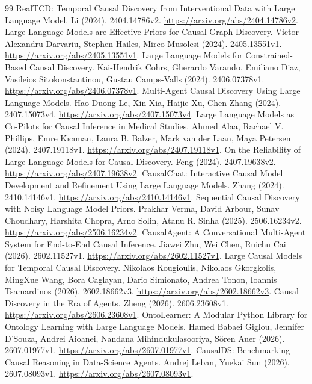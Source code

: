 \begin{thebibliography}{99}
 RealTCD: Temporal Causal Discovery from Interventional Data with Large Language Model. Li (2024). 2404.14786v2. \url{https://arxiv.org/abs/2404.14786v2}.
 Large Language Models are Effective Priors for Causal Graph Discovery. Victor-Alexandru Darvariu, Stephen Hailes, Mirco Musolesi (2024). 2405.13551v1. \url{https://arxiv.org/abs/2405.13551v1}.
 Large Language Models for Constrained-Based Causal Discovery. Kai-Hendrik Cohrs, Gherardo Varando, Emiliano Diaz, Vasileios Sitokonstantinou, Gustau Camps-Valls (2024). 2406.07378v1. \url{https://arxiv.org/abs/2406.07378v1}.
 Multi-Agent Causal Discovery Using Large Language Models. Hao Duong Le, Xin Xia, Haijie Xu, Chen Zhang (2024). 2407.15073v4. \url{https://arxiv.org/abs/2407.15073v4}.
 Large Language Models as Co-Pilots for Causal Inference in Medical Studies. Ahmed Alaa, Rachael V. Phillips, Emre Kıcıman, Laura B. Balzer, Mark van der Laan, Maya Petersen (2024). 2407.19118v1. \url{https://arxiv.org/abs/2407.19118v1}.
 On the Reliability of Large Language Models for Causal Discovery. Feng (2024). 2407.19638v2. \url{https://arxiv.org/abs/2407.19638v2}.
 CausalChat: Interactive Causal Model Development and Refinement Using Large Language Models. Zhang (2024). 2410.14146v1. \url{https://arxiv.org/abs/2410.14146v1}.
 Sequential Causal Discovery with Noisy Language Model Priors. Prakhar Verma, David Arbour, Sunav Choudhary, Harshita Chopra, Arno Solin, Atanu R. Sinha (2025). 2506.16234v2. \url{https://arxiv.org/abs/2506.16234v2}.
 CausalAgent: A Conversational Multi-Agent System for End-to-End Causal Inference. Jiawei Zhu, Wei Chen, Ruichu Cai (2026). 2602.11527v1. \url{https://arxiv.org/abs/2602.11527v1}.
 Large Causal Models for Temporal Causal Discovery. Nikolaos Kougioulis, Nikolaos Gkorgkolis, MingXue Wang, Bora Caglayan, Dario Simionato, Andrea Tonon, Ioannis Tsamardinos (2026). 2602.18662v3. \url{https://arxiv.org/abs/2602.18662v3}.
 Causal Discovery in the Era of Agents. Zheng (2026). 2606.23608v1. \url{https://arxiv.org/abs/2606.23608v1}.
 OntoLearner: A Modular Python Library for Ontology Learning with Large Language Models. Hamed Babaei Giglou, Jennifer D'Souza, Andrei Aioanei, Nandana Mihindukulasooriya, Sören Auer (2026). 2607.01977v1. \url{https://arxiv.org/abs/2607.01977v1}.
 CausalDS: Benchmarking Causal Reasoning in Data-Science Agents. Andrej Leban, Yuekai Sun (2026). 2607.08093v1. \url{https://arxiv.org/abs/2607.08093v1}.

\end{thebibliography}
